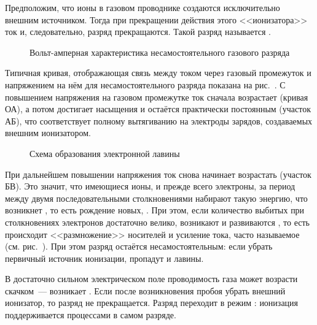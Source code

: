 Предположим, что ионы в газовом проводнике создаются исключительно внешним
источником. Тогда при прекращении действия этого <<ионизатора>> ток и,
следовательно, разряд прекращаются. Такой разряд называется
.

\begin{figure}[h]
    \centering
    \caption{Вольт-амперная характеристика несамостоятельного газового разряда}
\end{figure}

Типичная кривая, отображающая связь между током через газовый промежуток и
напряжением на нём для несамостоятельного разряда показана на
рис.~. С повышением напряжения
на газовом промежутке ток сначала возрастает (кривая ОА), а потом достигает
насыщения и остаётся практически постоянным (участок АБ), что соответствует
полному вытягиванию на электроды зарядов, создаваемых внешним ионизатором.

\begin{wrapfigure}{o}{0.36\textwidth}
    \centering
    \caption{Схема образования электронной лавины}
\end{wrapfigure}

При дальнейшем повышении напряжения ток снова начинает возрастать (участок БВ).
Это значит, что имеющиеся ионы, и прежде всего электроны, за период между двумя
последовательными столкновениями набирают такую энергию, что возникнет
, то есть рождение новых,
. При этом,
если количество выбитых при столкновениях электронов достаточно велико,
возникают и развиваются ,
то есть происходит <<размножение>> носителей и усиление тока,
часто называемое  (см. рис.~).
При этом разряд остаётся несамостоятельным: если убрать первичный источник
ионизации, пропадут и лавины.

В достаточно сильном электрическом поле проводимость газа может возрасти
скачком~--- возникает .
Если после возникновения пробоя убрать внешний ионизатор, то разряд не
прекращается. Разряд переходит в режим :
ионизация поддерживается процессами в самом разряде.

